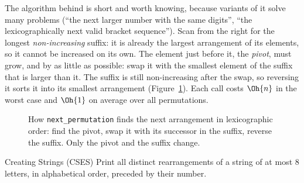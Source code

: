 The algorithm behind  is short and worth knowing, because variants of it solve many problems (``the
next larger number with the same digits'', ``the lexicographically next valid bracket sequence''). Scan from the right for
the longest \emph{non-increasing} suffix: it is already the largest arrangement of its elements, so it cannot be increased on
its own. The element just before it, the \emph{pivot}, must grow, and by as little as possible: swap it with the smallest
element of the suffix that is larger than it. The suffix is still non-increasing after the swap, so reversing it sorts it
into its smallest arrangement (Figure~\ref{fig:nextperm}). Each call costs $\Oh{n}$ in the worst case and $\Oh{1}$ on
average over all permutations.

\begin{figure}[htbp]
\centering
{}
\caption{How \texttt{next\_permutation} finds the next arrangement in lexicographic order: find the pivot, swap it with its
successor in the suffix, reverse the suffix. Only the pivot and the suffix change.}
\label{fig:nextperm}
\end{figure}

\begin{problem}{Creating Strings (CSES)}
Print all distinct rearrangements of a string of at most 8 letters, in alphabetical order, preceded by their number.
\end{problem}

